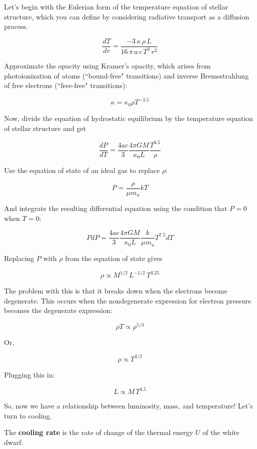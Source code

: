 \documentclass[a4paper]{article}
\begin{document}
\begin{enumerate}
Let's begin with the Eulerian form of the temperature equation of stellar structure, which you can define by considering radiative transport as a diffusion process. 

\begin{equation}
\frac{dT}{dr} = \frac{-3 \, \kappa \, \rho \, L}{16 \, \pi \, a \, c \, T^3 \, r^2}
\end{equation}

Approximate the opacity using Kramer's opacity, which arises from photoionization of atoms (``bound-free" transitions) and inverse Bremsstrahlung of free electrons (``free-free" transitions):

\begin{equation}
\kappa = \kappa_0 \rho T^{-3.5}
\end{equation}

Now, divide the equation of hydrostatic equilibrium by the temperature equation of stellar structure and get

$$ \frac{dP}{dT} = \frac{4ac}{3} \frac{4 \pi G M}{\kappa_0 L} \frac{T^{6.5}}{\rho} $$

Use the equation of state of an ideal gas to replace $\rho$:

\begin{equation}
P = \frac{\rho}{\mu m_u} kT
\end{equation}

And integrate the resulting differential equation using the condition that $P = 0$ when $T = 0$:

$$ P dP = \frac{4ac}{3} \frac{4 \pi G M}{\kappa_0 L} \frac{k}{\mu m_u} T^{7.5} dT $$

\noindent Replacing $P$ with $\rho$ from the equation of state gives

$$ \rho \propto M^{1/2} \, L^{-1/2} \, T^{3.25} $$

The problem with this is that it breaks down when the electrons become degenerate. This occurs when the nondegenerate expression for electron pressure becomes the degenerate expression:

$$ \rho T \propto \rho^{5/3} $$

Or,

$$ \rho \propto T^{3/2} $$

Plugging this in:

$$ L \propto M \, T^{3.5} $$

So, now we have a relationship between luminosity, mass, and temperature! Let's turn to cooling.

The \textbf{cooling rate} is the rate of change of the thermal energy $U$ of the white dwarf:


\end{enumerate}
\end{document}
